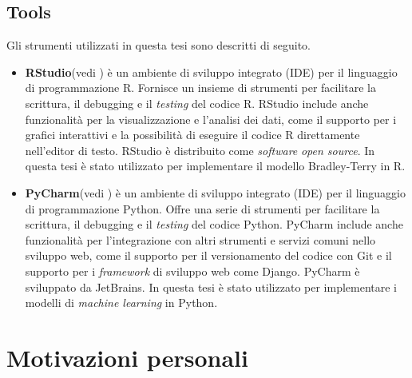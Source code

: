 \begin{comment}
library(ggmosaic)
library(ggplot2)
library(gridExtra)
@article{marchiori2020secrets,
	title={Secrets of soccer: Neural network flows and game performance},
	author={Marchiori, Massimo and de Vecchi, Marco},
	journal={Computers \& Electrical Engineering},
	volume={81},
	pages={106505},
	year={2020},
	publisher={Elsevier}
}
\end{comment}

\subsection{Tools}
Gli strumenti utilizzati in questa tesi sono descritti di seguito.
\begin{itemize}
	\item \textbf{RStudio}(vedi \textit{\cite{rstudio}}) è un ambiente di sviluppo integrato (IDE) per il linguaggio di programmazione R. Fornisce un insieme di strumenti per facilitare la scrittura, il debugging e il \emph{testing} del codice R. RStudio include anche funzionalità per la visualizzazione e l'analisi dei dati, come il supporto per i grafici interattivi e la possibilità di eseguire il codice R direttamente nell'editor di testo. RStudio è distribuito come \emph{software} \emph{open source}. In questa tesi è stato utilizzato per implementare il modello Bradley-Terry in R.
	\item \textbf{PyCharm}(vedi \textit{\cite{pycharm}}) è un ambiente di sviluppo integrato (IDE) per il linguaggio di programmazione Python. Offre una serie di strumenti per facilitare la scrittura, il debugging e il \emph{testing} del codice Python. PyCharm include anche funzionalità per l'integrazione con altri strumenti e servizi comuni nello sviluppo web, come il supporto per il versionamento del codice con Git e il supporto per i \emph{framework} di sviluppo web come Django. PyCharm  è sviluppato da JetBrains. In questa tesi è stato utilizzato per implementare i modelli di \emph{machine learning} in Python.
\end{itemize}

\section{Motivazioni personali}


